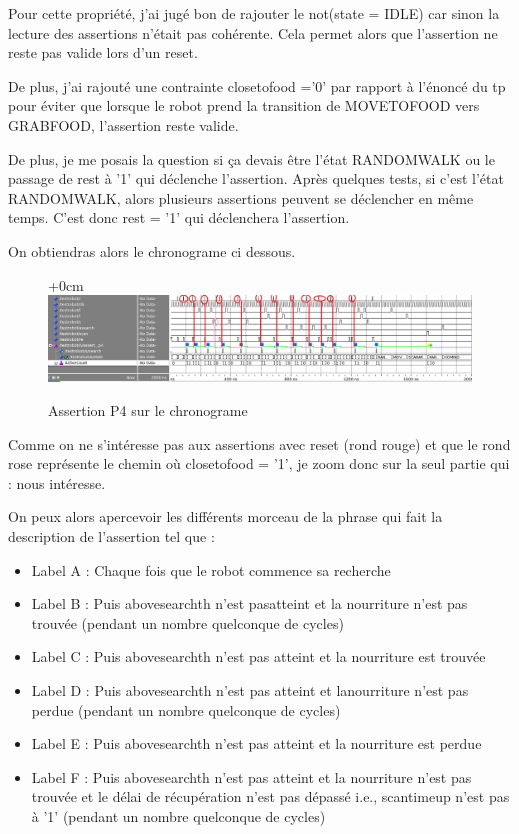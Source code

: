 \documentclass{article}
\newcommand{\alinea}{
\textbf{\hspace{8mm}}
}
\newcommand{\sautligne}{
\textbf{\vspace{5mm}}
}
\begin{document}
\begin{landscape}
Pour cette propriété, j'ai jugé bon de rajouter le not(state = IDLE) car sinon la lecture des assertions n'était pas cohérente. Cela permet alors que l'assertion ne reste pas valide lors d'un reset. 

\alinea 

De plus, j'ai rajouté une contrainte closetofood ='0' par rapport à l'énoncé du tp pour éviter que lorsque le robot prend la transition de MOVETOFOOD vers GRABFOOD, l'assertion reste valide.
\sautligne

De plus, je me posais la question si ça devais être l'état RANDOMWALK ou le passage de rest à '1' qui déclenche l'assertion. Après quelques tests, si c'est l'état RANDOMWALK, alors plusieurs assertions peuvent se déclencher en même temps. C'est donc rest = '1' qui déclenchera l'assertion.

On obtiendras alors le chronograme ci dessous. 

\begin{figure}[!h]
\advance\leftskip+0cm
\includegraphics[scale=0.45]{PSL/P4-1.PNG}
\caption{Assertion P4 sur le chronograme }
\end{figure}

\newpage

Comme on ne s'intéresse pas aux assertions avec reset (rond rouge) et que le rond rose représente le chemin où closetofood = '1', je zoom donc sur la seul partie qui : nous intéresse.

On peux alors apercevoir les différents morceau de la phrase qui fait la description de l'assertion tel que :
\begin{itemize}
\item Label A : Chaque fois que le robot commence sa recherche
\item Label B : Puis abovesearchth n'est pasatteint et la nourriture n'est pas trouvée (pendant un nombre quelconque de cycles)
\item Label C : Puis abovesearchth n'est pas atteint et la nourriture est trouvée
\item Label D : Puis abovesearchth n'est pas atteint et lanourriture n'est pas perdue (pendant un nombre quelconque de cycles)
\item Label E : Puis abovesearchth n'est pas atteint et la nourriture est perdue
\item Label F : Puis abovesearchth n'est pas atteint et la nourriture n'est pas trouvée et le délai de récupération n'est pas dépassé i.e., scantimeup n'est pas à '1' (pendant un
nombre quelconque de cycles)


\end{itemize}
\end{landscape}
\end{document}
